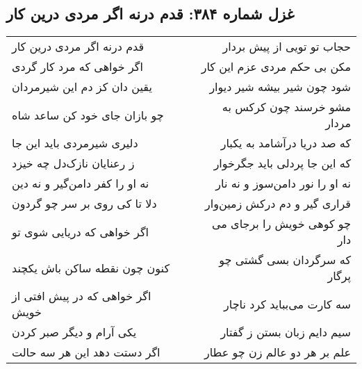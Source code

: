 \begin{center}
\section*{غزل شماره ۳۸۴: قدم درنه اگر مردی درین کار}
\label{sec:384}
\begin{longtable}{l p{0.5cm} r}
قدم درنه اگر مردی درین کار
&&
حجاب تو تویی از پیش بردار
\\
اگر خواهی که مرد کار گردی
&&
مکن بی حکم مردی عزم این کار
\\
یقین دان کز دم این شیرمردان
&&
شود چون شیر بیشه شیر دیوار
\\
چو بازان جای خود کن ساعد شاه
&&
مشو خرسند چون کرکس به مردار
\\
دلیری شیرمردی باید این جا
&&
که صد دریا درآشامد به یکبار
\\
ز رعنایان نازک‌دل چه خیزد
&&
که این جا پردلی باید جگرخوار
\\
نه او را کفر دامن‌گیر و نه دین
&&
نه او را نور دامن‌سوز و نه نار
\\
دلا تا کی روی بر سر چو گردون
&&
قراری گیر و دم درکش زمین‌وار
\\
اگر خواهی که دریایی شوی تو
&&
چو کوهی خویش را برجای می دار
\\
کنون چون نقطه ساکن باش یکچند
&&
که سرگردان بسی گشتی چو پرگار
\\
اگر خواهی که در پیش افتی از خویش
&&
سه کارت می‌بباید کرد ناچار
\\
یکی آرام و دیگر صبر کردن
&&
سیم دایم زبان بستن ز گفتار
\\
اگر دستت دهد این هر سه حالت
&&
علم بر هر دو عالم زن چو عطار
\\
\end{longtable}
\end{center}
